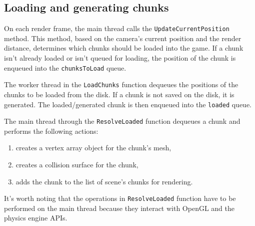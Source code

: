 \subsection{Loading and generating chunks}
On each render frame, the main thread calls the \texttt{UpdateCurrentPosition} method.
This method, based on the camera's current position and the render distance, determines which chunks should be loaded into the game.
If a chunk isn't already loaded or isn't queued for loading, the position of the chunk is enqueued into the \texttt{chunksToLoad} queue.

The worker thread in the \texttt{LoadChunks} function dequeues the positions of the chunks to be loaded from the disk.
If a chunk is not saved on the disk, it is generated.
The loaded/generated chunk is then enqueued into the \texttt{loaded} queue.

The main thread through the \texttt{ResolveLoaded} function dequeues a chunk and performs the following actions:
\begin{enumerate}
    \item creates a vertex array object for the chunk's mesh,
    \item creates a collision surface for the chunk,
    \item adds the chunk to the list of scene's chunks for rendering.
\end{enumerate}

It's worth noting that the operations in \texttt{ResolveLoaded} function have to be performed on the main thread because they interact with OpenGL and the physics engine APIs.